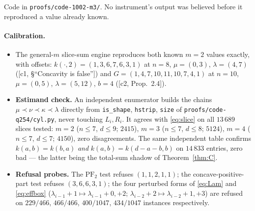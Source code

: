 \documentclass[11pt]{article}
\theoremstyle{definition}
\newcommand{\PFtwo}{\mathrm{PF}_2}
\begin{document}
Code in \verb|proofs/code-1002-m3/|. No instrument's output was believed before it
reproduced a value already known.

\paragraph{Calibration.}
\begin{itemize}
\item The general-$m$ slice-sum engine reproduces both known $m=2$ values exactly, with
offsets: $k(\cdot,2)=(1,3,6,7,6,3,1)$ at $n=8$, $\mu=(0,3)$, $\lambda=(4,7)$
([c1, §``Concavity is false'']) and $G=(1,4,7,10,11,10,7,4,1)$ at $n=10$, $\mu=(0,5)$,
$\lambda=(5,12)$, $b=4$ ([c2, Prop.~2.4]).
\item \textbf{Estimand check.} An independent enumerator builds the chains
$\mu\prec\nu\prec\kappa\prec\lambda$ directly from \verb|is_shape|, \verb|hstrip|,
\verb|size| of \verb|proofs/code-q254/cyl.py|, never touching $L_i,R_i$. It agrees with
\eqref{eq:slice} on all $13\,689$ slices tested: $m=2$ ($n\le7$, $d\le9$; $2415$), $m=3$
($n\le7$, $d\le8$; $5124$), $m=4$ ($n\le7$, $d\le7$; $4150$), zero disagreements. The same
independent table confirms $k(a,b)=k(b,a)$ \emph{and} $k(a,b)=k(d-a-b,b)$ on $14\,833$
entries, zero bad --- the latter being the total-sum shadow of Theorem~\ref{thm:C}.
\item \textbf{Refusal probes.} The $\PFtwo$ test refuses $(1,1,2,1,1)$; the
concave-positive-part test refuses $(3,6,6,3,1)$; the four perturbed forms of
\eqref{eq:Lam} and \eqref{eq:effbox} ($\lambda_{i-1}+1\mapsto\lambda_{i-1}+0,+2$;
$\lambda_{i-2}+2\mapsto\lambda_{i-2}+1,+3$) are refused on $229/466$, $466/466$,
$400/1047$, $434/1047$ instances respectively.
\end{itemize}
\end{document}
